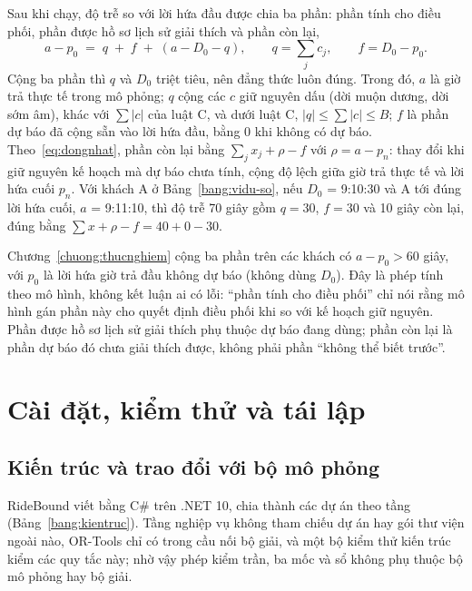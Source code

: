 Sau khi chạy, độ trễ so với lời hứa đầu được chia ba phần: phần tính cho điều phối, phần được hồ sơ lịch sử giải
thích và phần còn lại,
\begin{equation}
a - p_0 \;=\; q \;+\; f \;+\; (a - D_0 - q), \qquad q = \sum_{j} c_j, \qquad f = D_0 - p_0 .
\label{eq:so}
\end{equation}
Cộng ba phần thì $q$ và $D_0$ triệt tiêu, nên đẳng thức luôn đúng. Trong đó, $a$ là giờ trả thực tế trong mô
phỏng; $q$ cộng các $c$ giữ nguyên dấu (dời muộn dương, dời sớm âm), khác với $\sum |c|$ của luật C, và dưới luật
C, $|q| \le \sum |c| \le B$; $f$ là phần dự báo đã cộng sẵn vào lời hứa đầu, bằng 0 khi không có dự báo.
Theo~\eqref{eq:dongnhat}, phần còn lại bằng $\sum_j x_j + \rho - f$ với $\rho = a - p_n$: thay đổi khi giữ nguyên
kế hoạch mà dự báo chưa tính, cộng độ lệch giữa giờ trả thực tế và lời hứa cuối $p_n$. Với khách A ở
Bảng~\ref{bang:vidu-so}, nếu $D_0$ = 9:10:30 và A tới đúng lời hứa cuối, $a$ = 9:11:10, thì độ trễ 70 giây gồm
$q = 30$, $f = 30$ và 10 giây còn lại, đúng bằng $\sum x + \rho - f = 40 + 0 - 30$.

Chương~\ref{chuong:thucnghiem} cộng ba phần trên các khách có $a - p_0 > 60$ giây, với $p_0$ là lời hứa giờ trả
đầu không dự báo (không dùng $D_0$). Đây là phép tính theo mô hình, không kết luận ai có lỗi: ``phần tính cho điều
phối'' chỉ nói rằng mô hình gán phần này cho quyết định điều phối khi so với kế hoạch giữ nguyên. Phần được hồ sơ
lịch sử giải thích phụ thuộc dự báo đang dùng; phần còn lại là phần dự báo đó chưa giải thích được, không phải phần
``không thể biết trước''.

\section{Cài đặt, kiểm thử và tái lập}
\label{muc:caidat}

\subsection{Kiến trúc và trao đổi với bộ mô phỏng}
\label{muc:kientruc}

RideBound viết bằng C\# trên .NET 10, chia thành các dự án theo tầng (Bảng~\ref{bang:kientruc}). Tầng nghiệp vụ
không tham chiếu dự án hay gói thư viện ngoài nào, OR-Tools chỉ có trong cầu nối bộ giải, và một bộ kiểm thử kiến
trúc kiểm các quy tắc này; nhờ vậy phép kiểm trần, ba mốc và sổ không phụ thuộc bộ mô phỏng hay bộ giải.

